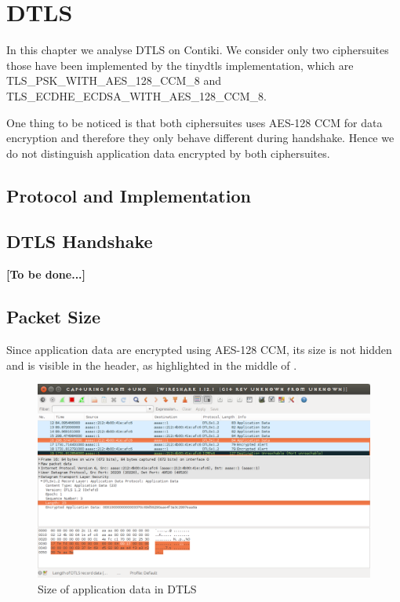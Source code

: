\chapter{DTLS} \label{Chp: DTLS}

In this chapter we analyse DTLS on Contiki. We consider only two ciphersuites those have been implemented by the tinydtls implementation, which are TLS\_PSK\_WITH\_AES\_128\_CCM\_8 and TLS\_ECDHE\_ECDSA\_WITH\_AES\_128\_CCM\_8. 

One thing to be noticed is that both ciphersuites uses AES-128 CCM for data encryption and therefore they only behave different during handshake. Hence we do not distinguish application data encrypted by both ciphersuites.

\section{Protocol and Implementation}

\section{DTLS Handshake}

\textbf{[To be done...]}

\section{Packet Size}

Since application data are encrypted using AES-128 CCM, its size is not hidden and is visible in the header, as highlighted in the middle of .

\begin{figure}[ht!]
	\center
	\includegraphics[width=.7\textwidth]{fig/dtlslength.png}
	\caption{Size of application data in DTLS}
	\label{Fig: Size of application data in DTLS}
\end{figure}

